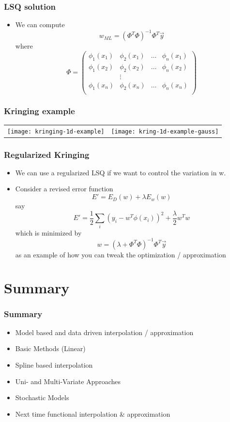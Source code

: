 \documentclass[10pt]{beamer}
\begin{document}
\begin{frame}
  \frametitle{LSQ solution}
  \begin{itemize}
  \item We can compute
    \[
      w_{ML} = (\Phi^T \Phi)^{-1} \Phi^T \vec{y}
    \]
    where
    \[
      \Phi = \left(
        \begin{array}{cccc}
          \phi_1(x_1) & \phi_2(x_1) & \ldots & \phi_n(x_1) \\
          \phi_1(x_2) & \phi_2(x_2) & \ldots & \phi_n(x_2) \\
                      & \vdots      &        &             \\
          \phi_1(x_n) & \phi_2(x_n) & \ldots & \phi_n(x_n) \\
        \end{array} \right)
      \]
  \end{itemize}
\end{frame}

\begin{frame}
  \frametitle{Kringing example}
  \begin{center}
    \begin{tabular}{cc}
      \texttt{[image: kringing-1d-example]}&\texttt{[image: kring-1d-example-gauss]}\\
    \end{tabular}
  \end{center}
\end{frame}

\begin{frame}
  \frametitle{Regularized Kringing}
  \begin{itemize}
  \item We can use a regularized LSQ if we want to control the variation in w. 
  \item Consider a revised error function
    \[ E' = E_D(w) + \lambda E_w(w) \] say
    \[ E' = \frac{1}{2} \sum_i (y_i - w^T\phi(x_i))^2 + \frac{\lambda}{2} w^T w \]
    which is minimized by
    \[
      w = (\lambda + \Phi^T \Phi)^{-1} \Phi^T \vec{y}
    \]
    as an example of how you can tweak the optimization / approximation    
  \end{itemize}
\end{frame}


\section{Summary}

\begin{frame}
  \frametitle{Summary}
  \begin{itemize}
  \item Model based and data driven interpolation / approximation
  \item Basic Methods (Linear)
  \item Spline based interpolation
  \item Uni- and Multi-Variate Approaches
  \item Stochastic Models
  \item Next time functional interpolation \& approximation 
  \end{itemize}
\end{frame}
\end{document}
